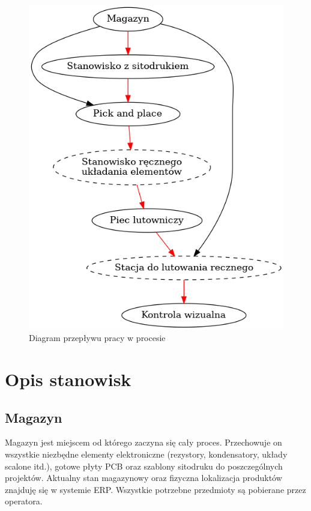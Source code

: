 \begin{figure}[H]
	\centering
	\includegraphics[scale=0.5]{./chapters/chapter2/diagram.png}
	\caption{Diagram przepływu pracy w procesie}
	\label{DiagFlow}
\end{figure}

\section{Opis stanowisk}

\subsection{Magazyn}
Magazyn jest miejscem od którego zaczyna się cały proces.
Przechowuje on wszystkie niezbędne elementy elektroniczne (rezystory, kondensatory, układy scalone itd.), gotowe płyty PCB oraz szablony sitodruku do poszczególnych projektów.
Aktualny stan magazynowy oraz fizyczna lokalizacja produktów znajduję się w systemie ERP\@.
Wszystkie potrzebne przedmioty są pobierane przez operatora.

